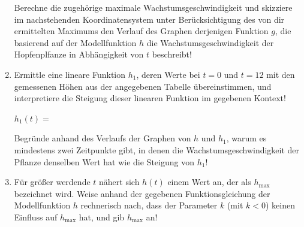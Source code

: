 \begin{langesbeispiel}
\begin{enumerate}
	Berechne die zugehörige maximale Wachstumsgeschwindigkeit und skizziere im nachstehenden Koordinatensystem unter Berücksichtigung des von dir ermittelten Maximums den Verlauf des Graphen derjenigen Funktion $g$, die basierend auf der Modellfunktion $h$ die Wachstumsgeschwindigkeit der Hopfenplfanze in Abhängigkeit von $t$ beschreibt!	
	
		\begin{center}
	\end{center}
	
\item Ermittle eine lineare Funktion $h_1$, deren Werte bei $t=0$ und $t=12$ mit den gemessenen Höhen aus der angegebenen Tabelle übereinstimmen, und interpretiere die Steigung dieser linearen Funktion im gegebenen Kontext!

$h_1(t)=$\,
	
Begründe anhand des Verlaufs der Graphen von $h$ und $h_1$, warum es mindestens zwei Zeitpunkte gibt, in denen die Wachstumsgeschwindigkeit der Pflanze denselben Wert hat wie die Steigung von $h_1$!

\item Für größer werdende $t$ nähert sich $h(t)$ einem Wert an, der als $h_{\text{max}}$ bezeichnet wird. Weise anhand der gegebenen Funktionsgleichung der Modellfunktion $h$ rechnerisch nach, dass der Parameter $k$ (mit $k<0$) keinen Einfluss auf $h_{\text{max}}$ hat, und gib $h_{\text{max}}$ an!


\end{enumerate}
\end{langesbeispiel}

